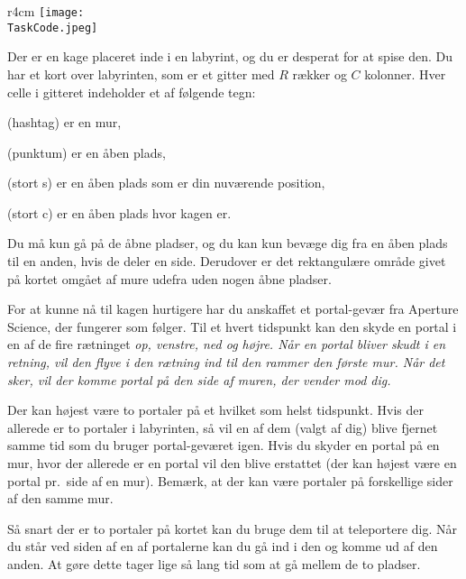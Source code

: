 \documentclass{boi2014-dk}
\renewcommand{\TaskCode}{portals}
\newcommand{\constant}[1]{{\tt #1}}
\begin{document}
    \begin{wrapfigure}[4]{r}{4cm}
        \vspace{-24pt}
		\texttt{[image: \\TaskCode.jpeg]}
	\end{wrapfigure}

    Der er en kage placeret inde i en labyrint, og du er desperat for at spise
    den. Du har et kort over labyrinten, som er et gitter med $R$ rækker og $C$
    kolonner. Hver celle i gitteret indeholder et af følgende tegn:
    \begin{description}[itemindent=1pt]
    	\item[\constant{\#}] (hashtag) er en mur,
        \item[\constant{.}] (punktum) er en åben plads,
        \item[\constant{S}] (stort s) er en åben plads som er din
            nuværende position,
        \item[\constant{C}] (stort c) er en åben plads hvor kagen er.
    \end{description}

    Du må kun gå på de åbne pladser, og du kan kun bevæge dig fra en åben plads
    til en anden, hvis de deler en side. Derudover er det rektangulære område
    givet på kortet omgået af mure udefra uden nogen åbne pladser.

    For at kunne nå til kagen hurtigere har du anskaffet et portal-gevær
    fra Aperture Science\texttrademark{}, der fungerer som følger.
    Til et hvert tidspunkt kan den skyde en portal i en af de fire rætninget
    \em{op}, \em{venstre}, \em{ned} og \em{højre}. Når en portal bliver skudt i
    en retning, vil den flyve i den rætning ind til den rammer den første mur.
    Når det sker, vil der komme portal på den side af muren, der vender mod
    dig.

    Der kan højest være to portaler på et hvilket som helst tidspunkt. Hvis der
    allerede er to portaler i labyrinten, så vil en af dem (valgt af dig) blive
    fjernet samme tid som du bruger portal-geværet igen. Hvis du skyder en
    portal på en mur, hvor der allerede er en portal vil den blive erstattet
    (der kan højest være en portal pr.~side af en mur). Bemærk, at der kan være
    portaler på forskellige sider af den samme mur.

    Så snart der er to portaler på kortet kan du bruge dem til at teleportere
    dig. Når du står ved siden af en af portalerne kan du gå ind i den og komme
    ud af den anden. At gøre dette tager lige så lang tid som at gå mellem de
    to pladser.
\end{document}
